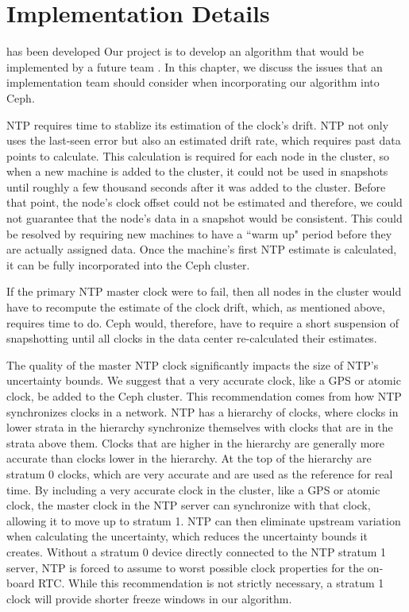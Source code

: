 \chapter{Implementation Details}
\label{sec:impl}

\alg has been developed Our project is to develop an algorithm that would be implemented by a
future team \alg. \alg In this chapter, we discuss the issues that an
implementation team should consider when incorporating our algorithm
into Ceph.

NTP requires time to stablize its estimation of the clock's drift.
NTP not only uses the last-seen error but also an estimated drift
rate, which requires past data points to calculate. This calculation
is required for each node in the cluster, so when a new machine is
added to the cluster, it could not be used in snapshots until roughly
a few thousand seconds after it was added to the cluster. Before that
point, the node's clock offset could not be estimated and therefore,
we could not guarantee that the node's data in a snapshot would be
consistent. This could be resolved by requiring new machines to have a
``warm up" period before they are actually assigned data. Once the
machine's first NTP estimate is calculated, it can be fully
incorporated into the Ceph cluster.

If the primary NTP master clock were to fail, then all nodes in the
cluster would have to recompute the estimate of the clock drift,
which, as mentioned above, requires time to do. Ceph would, therefore,
have to require a short suspension of snapshotting until all clocks in
the data center re-calculated their estimates.

The quality of the master NTP clock significantly impacts the size of
NTP's uncertainty bounds. We suggest that a very accurate clock, like
a GPS or atomic clock, be added to the Ceph cluster. This
recommendation comes from how NTP synchronizes clocks in a
network. NTP has a hierarchy of clocks, where clocks in lower strata
in the hierarchy synchronize themselves with clocks that are in the
strata above them. Clocks that are higher in the hierarchy are
generally more accurate than clocks lower in the hierarchy. At the top
of the hierarchy are stratum 0 clocks, which are very accurate and are
used as the reference for real time. By including a very accurate
clock in the cluster, like a GPS or atomic clock, the master clock in
the NTP server can synchronize with that clock, allowing it to move up
to stratum 1. NTP can then eliminate upstream variation when
calculating the uncertainty, which reduces the uncertainty bounds it
creates. Without a stratum 0 device directly connected to the NTP
stratum 1 server, NTP is forced to assume to worst possible clock
properties for the on-board RTC. While this recommendation is not
strictly necessary, a stratum 1 clock will provide shorter freeze
windows in our algorithm.

